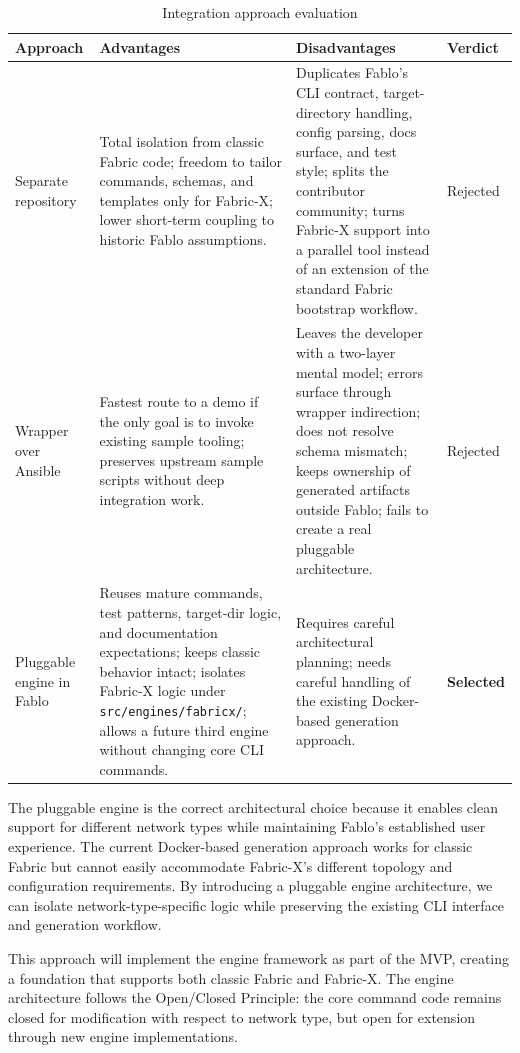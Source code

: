 \begin{table}[h]
\centering
\begin{tabularx}{\textwidth}{|p{2.6cm}|X|X|p{1.6cm}|}
\hline
\textbf{Approach} & \textbf{Advantages} & \textbf{Disadvantages} & \textbf{Verdict} \\
\hline
Separate repository & Total isolation from classic Fabric code; freedom to tailor commands, schemas, and templates only for Fabric-X; lower short-term coupling to historic Fablo assumptions. & Duplicates Fablo's CLI contract, target-directory handling, config parsing, docs surface, and test style; splits the contributor community; turns Fabric-X support into a parallel tool instead of an extension of the standard Fabric bootstrap workflow. & Rejected \\
\hline
Wrapper over Ansible & Fastest route to a demo if the only goal is to invoke existing sample tooling; preserves upstream sample scripts without deep integration work. & Leaves the developer with a two-layer mental model; errors surface through wrapper indirection; does not resolve schema mismatch; keeps ownership of generated artifacts outside Fablo; fails to create a real pluggable architecture. & Rejected \\
\hline
Pluggable engine in Fablo & Reuses mature commands, test patterns, target-dir logic, and documentation expectations; keeps classic behavior intact; isolates Fabric-X logic under \texttt{src/engines/fabricx/}; allows a future third engine without changing core CLI commands. & Requires careful architectural planning; needs careful handling of the existing Docker-based generation approach. & \textbf{Selected} \\
\hline
\end{tabularx}
\caption{Integration approach evaluation}
\label{tab:approaches}
\end{table}

The pluggable engine is the correct architectural choice because it enables clean support for different network types while maintaining Fablo's established user experience. The current Docker-based generation approach works for classic Fabric but cannot easily accommodate Fabric-X's different topology and configuration requirements. By introducing a pluggable engine architecture, we can isolate network-type-specific logic while preserving the existing CLI interface and generation workflow.

This approach will implement the engine framework as part of the MVP, creating a foundation that supports both classic Fabric and Fabric-X. The engine architecture follows the Open/Closed Principle: the core command code remains closed for modification with respect to network type, but open for extension through new engine implementations.

